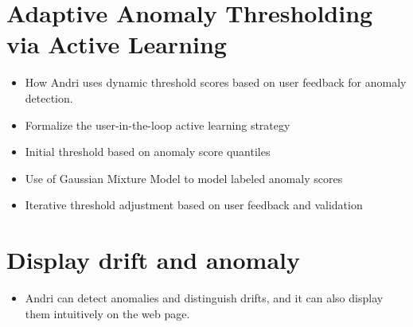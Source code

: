 \section{Adaptive Anomaly Thresholding via Active Learning}
\begin{itemize}
    \item How Andri uses dynamic threshold scores based on user feedback for anomaly detection.
    \item Formalize the user-in-the-loop active learning strategy
    \item Initial threshold based on anomaly score quantiles
    \item Use of Gaussian Mixture Model to model labeled anomaly scores
    \item Iterative threshold adjustment based on user feedback and validation
\end{itemize}


\section{Display drift and anomaly}
\begin{itemize}
    \item Andri can detect anomalies and distinguish drifts, and it can also display them intuitively on the web page.  
\end{itemize}